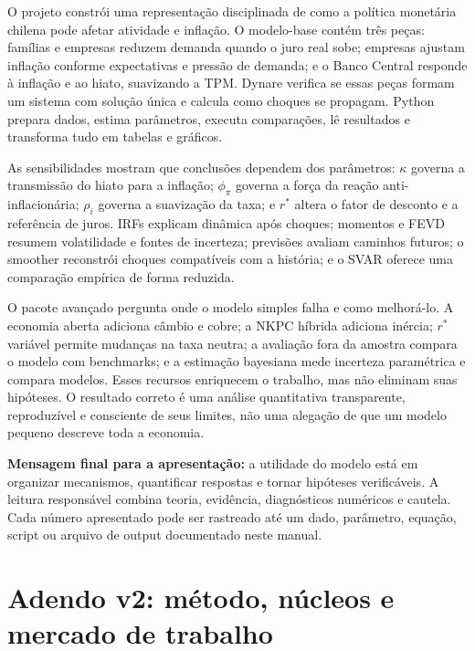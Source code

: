 \documentclass[11pt,a4paper]{article}
\begin{document}
O projeto constrói uma representação disciplinada de como a política monetária chilena pode afetar
atividade e inflação. O modelo-base contém três peças: famílias e empresas reduzem demanda quando o
juro real sobe; empresas ajustam inflação conforme expectativas e pressão de demanda; e o Banco
Central responde à inflação e ao hiato, suavizando a TPM. Dynare verifica se essas peças formam um
sistema com solução única e calcula como choques se propagam. Python prepara dados, estima
parâmetros, executa comparações, lê resultados e transforma tudo em tabelas e gráficos.

As sensibilidades mostram que conclusões dependem dos parâmetros: \(\kappa\) governa a transmissão
do hiato para a inflação; \(\phi_\pi\) governa a força da reação anti-inflacionária; \(\rho_i\)
governa a suavização da taxa; e \(r^\ast\) altera o fator de desconto e a referência de juros. IRFs
explicam dinâmica após choques; momentos e FEVD resumem volatilidade e fontes de incerteza;
previsões avaliam caminhos futuros; o smoother reconstrói choques compatíveis com a história; e o
SVAR oferece uma comparação empírica de forma reduzida.

O pacote avançado pergunta onde o modelo simples falha e como melhorá-lo. A economia aberta
adiciona câmbio e cobre; a NKPC híbrida adiciona inércia; \(r^\ast\) variável permite mudanças na
taxa neutra; a avaliação fora da amostra compara o modelo com benchmarks; e a estimação bayesiana
mede incerteza paramétrica e compara modelos. Esses recursos enriquecem o trabalho, mas não eliminam
suas hipóteses. O resultado correto é uma análise quantitativa transparente, reproduzível e
consciente de seus limites, não uma alegação de que um modelo pequeno descreve toda a economia.

\begin{resumo}
\textbf{Mensagem final para a apresentação:} a utilidade do modelo está em organizar mecanismos,
quantificar respostas e tornar hipóteses verificáveis. A leitura responsável combina teoria,
evidência, diagnósticos numéricos e cautela. Cada número apresentado pode ser rastreado até um dado,
parâmetro, equação, script ou arquivo de output documentado neste manual.
\end{resumo}

\section{Adendo v2: método, núcleos e mercado de trabalho}
\end{document}
